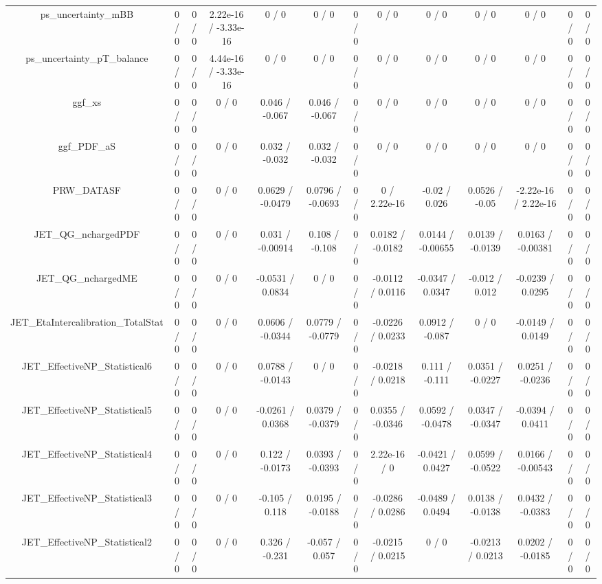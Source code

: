 \documentclass[10pt]{article}
\begin{document}
\begin{table}[htbp]
\begin{center}
\begin{tabular}{|c|c|c|c|c|c|c|c|c|c|c|c|c|}
  ps_uncertainty_mBB & 0 / 0 & 0 / 0 & 2.22e-16 / -3.33e-16 & 0 / 0 & 0 / 0 & 0 / 0 & 0 / 0 & 0 / 0 & 0 / 0 & 0 / 0 & 0 / 0 & 0 / 0 \\ 
  ps_uncertainty_pT_balance & 0 / 0 & 0 / 0 & 4.44e-16 / -3.33e-16 & 0 / 0 & 0 / 0 & 0 / 0 & 0 / 0 & 0 / 0 & 0 / 0 & 0 / 0 & 0 / 0 & 0 / 0 \\ 
  ggf_xs & 0 / 0 & 0 / 0 & 0 / 0 & 0.046 / -0.067 & 0.046 / -0.067 & 0 / 0 & 0 / 0 & 0 / 0 & 0 / 0 & 0 / 0 & 0 / 0 & 0 / 0 \\ 
  ggf_PDF_aS & 0 / 0 & 0 / 0 & 0 / 0 & 0.032 / -0.032 & 0.032 / -0.032 & 0 / 0 & 0 / 0 & 0 / 0 & 0 / 0 & 0 / 0 & 0 / 0 & 0 / 0 \\ 
  PRW_DATASF & 0 / 0 & 0 / 0 & 0 / 0 & 0.0629 / -0.0479 & 0.0796 / -0.0693 & 0 / 0 & 0 / 2.22e-16 & -0.02 / 0.026 & 0.0526 / -0.05 & -2.22e-16 / 2.22e-16 & 0 / 0 & 0 / 0 \\ 
  JET_QG_nchargedPDF & 0 / 0 & 0 / 0 & 0 / 0 & 0.031 / -0.00914 & 0.108 / -0.108 & 0 / 0 & 0.0182 / -0.0182 & 0.0144 / -0.00655 & 0.0139 / -0.0139 & 0.0163 / -0.00381 & 0 / 0 & 0 / 0 \\ 
  JET_QG_nchargedME & 0 / 0 & 0 / 0 & 0 / 0 & -0.0531 / 0.0834 & 0 / 0 & 0 / 0 & -0.0112 / 0.0116 & -0.0347 / 0.0347 & -0.012 / 0.012 & -0.0239 / 0.0295 & 0 / 0 & 0 / 0 \\ 
  JET_EtaIntercalibration_TotalStat & 0 / 0 & 0 / 0 & 0 / 0 & 0.0606 / -0.0344 & 0.0779 / -0.0779 & 0 / 0 & -0.0226 / 0.0233 & 0.0912 / -0.087 & 0 / 0 & -0.0149 / 0.0149 & 0 / 0 & 0 / 0 \\ 
  JET_EffectiveNP_Statistical6 & 0 / 0 & 0 / 0 & 0 / 0 & 0.0788 / -0.0143 & 0 / 0 & 0 / 0 & -0.0218 / 0.0218 & 0.111 / -0.111 & 0.0351 / -0.0227 & 0.0251 / -0.0236 & 0 / 0 & 0 / 0 \\ 
  JET_EffectiveNP_Statistical5 & 0 / 0 & 0 / 0 & 0 / 0 & -0.0261 / 0.0368 & 0.0379 / -0.0379 & 0 / 0 & 0.0355 / -0.0346 & 0.0592 / -0.0478 & 0.0347 / -0.0347 & -0.0394 / 0.0411 & 0 / 0 & 0 / 0 \\ 
  JET_EffectiveNP_Statistical4 & 0 / 0 & 0 / 0 & 0 / 0 & 0.122 / -0.0173 & 0.0393 / -0.0393 & 0 / 0 & 2.22e-16 / 0 & -0.0421 / 0.0427 & 0.0599 / -0.0522 & 0.0166 / -0.00543 & 0 / 0 & 0 / 0 \\ 
  JET_EffectiveNP_Statistical3 & 0 / 0 & 0 / 0 & 0 / 0 & -0.105 / 0.118 & 0.0195 / -0.0188 & 0 / 0 & -0.0286 / 0.0286 & -0.0489 / 0.0494 & 0.0138 / -0.0138 & 0.0432 / -0.0383 & 0 / 0 & 0 / 0 \\ 
  JET_EffectiveNP_Statistical2 & 0 / 0 & 0 / 0 & 0 / 0 & 0.326 / -0.231 & -0.057 / 0.057 & 0 / 0 & -0.0215 / 0.0215 & 0 / 0 & -0.0213 / 0.0213 & 0.0202 / -0.0185 & 0 / 0 & 0 / 0 \\ 

\end{tabular}
\end{center}
\end{table}
\end{document}
